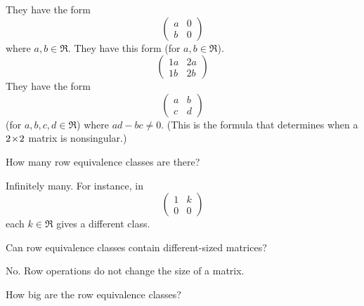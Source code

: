 \begin{exercises}
\begin{answer}
      \begin{exparts}
        \partsitem They have the form
          \begin{equation*}
            \begin{pmatrix}
              a  &0  \\
              b  &0
            \end{pmatrix}
          \end{equation*}
          where \( a,b\in\Re \).
        \partsitem They have this form (for \( a,b\in\Re \)).
          \begin{equation*}
            \begin{pmatrix}
             1a  &2a \\
             1b  &2b
            \end{pmatrix}
          \end{equation*}
        \partsitem They have the form
          \begin{equation*}
            \begin{pmatrix}
              a  &b  \\
              c  &d
            \end{pmatrix}
          \end{equation*}
          (for \( a,b,c,d\in\Re \)) where \( ad-bc\neq 0 \).
          (This is the formula that determines when a \( 2 \! \times \! 2 \) matrix
          is nonsingular.)
      \end{exparts}  
    \end{answer}
  \item 
    How many row equivalence classes are there?
    \begin{answer}
       Infinitely many.
       For instance, in 
       \begin{equation*}
         \begin{pmatrix}
           1  &k  \\
           0  &0
         \end{pmatrix}
       \end{equation*}
       each $k\in\Re$ gives a different class.  
    \end{answer}
  \item 
    Can row equivalence classes contain different-sized matrices?
    \begin{answer}
      No.
      Row operations do not change the size of a matrix.  
    \end{answer}
  \item 
    How big are the row equivalence classes?

\end{exercises}
